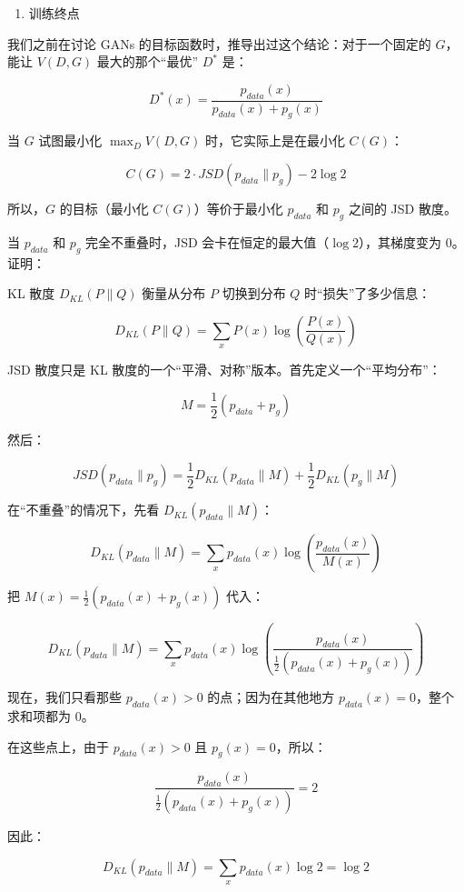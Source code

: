 \begin{enumerate}
\def\labelenumi{\arabic{enumi}.}
\setcounter{enumi}{2}
\tightlist
\item
  训练终点
\end{enumerate}

我们之前在讨论 GANs 的目标函数时，推导出过这个结论：对于一个固定的 \(G\)，能让 \(V(D,G)\) 最大的那个``最优'' \(D^*\) 是：

\[
D^*(x)=\frac{p_{data}(x)}{p_{data}(x)+p_g(x)}
\]

当 \(G\) 试图最小化 \(\max_D V(D,G)\) 时，它实际上是在最小化 \(C(G)\)：

\[
C(G)=2\cdot JSD(p_{data}\parallel p_g)-2\log 2
\]

所以，\(G\) 的目标（最小化 \(C(G)\)）等价于最小化 \(p_{data}\) 和 \(p_g\) 之间的 JSD 散度。

当 \(p_{data}\) 和 \(p_g\) 完全不重叠时，JSD 会卡在恒定的最大值（\(\log 2\)），其梯度变为 \(0\)。证明：

KL 散度 \(D_{KL}(P\parallel Q)\) 衡量从分布 \(P\) 切换到分布 \(Q\) 时``损失''了多少信息：

\[
D_{KL}(P\parallel Q)=\sum_x P(x)\log\left(\frac{P(x)}{Q(x)}\right)
\]

JSD 散度只是 KL 散度的一个``平滑、对称''版本。首先定义一个``平均分布''：

\[
M=\frac{1}{2}(p_{data}+p_g)
\]

然后：

\[
JSD(p_{data}\parallel p_g)=\frac{1}{2}D_{KL}(p_{data}\parallel M)+\frac{1}{2}D_{KL}(p_g\parallel M)
\]

在``不重叠''的情况下，先看 \(D_{KL}(p_{data}\parallel M)\)：

\[
D_{KL}(p_{data}\parallel M)=\sum_x p_{data}(x)\log\left(\frac{p_{data}(x)}{M(x)}\right)
\]

把 \(M(x)=\frac{1}{2}(p_{data}(x)+p_g(x))\) 代入：

\[
D_{KL}(p_{data}\parallel M)=\sum_x p_{data}(x)\log\left(\frac{p_{data}(x)}{\frac{1}{2}(p_{data}(x)+p_g(x))}\right)
\]

现在，我们只看那些 \(p_{data}(x)>0\) 的点；因为在其他地方 \(p_{data}(x)=0\)，整个求和项都为 0。

在这些点上，由于 \(p_{data}(x)>0\) 且 \(p_g(x)=0\)，所以：

\[
\frac{p_{data}(x)}{\frac{1}{2}(p_{data}(x)+p_g(x))}=2
\]

因此：

\[
D_{KL}(p_{data}\parallel M)=\sum_x p_{data}(x)\log 2=\log 2
\]

